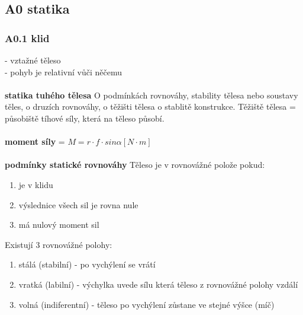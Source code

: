 \documentclass{article}
\begin{document}
\subsection*{A0 statika}
\subsubsection*{A0.1 klid}
- vztažné těleso \\
- pohyb je relativní vůči něčemu \\\\
\textbf{statika tuhého tělesa}
O podmínkách rovnováhy, stability tělesa nebo soustavy těles, o druzích rovnováhy, o těžišti tělesa o stablitě konstrukce. Těžiště tělesa = působiště tíhové síly, která na těleso působí. \\\\
\textbf{moment síly} = $M = r \cdot f \cdot sin \alpha [N \cdot m]$ \\\\
\textbf{podmínky statické rovnováhy}
Těleso je v rovnovážné polože pokud:
\begin{enumerate}
    \item je v klidu
    \item výslednice všech sil je rovna nule
    \item má nulový moment sil
\end{enumerate}
Existují 3 rovnovážné polohy:
\begin{enumerate}
    \item stálá (stabilní) - po vychýlení se vrátí 
    \item vratká (labilní) - výchylka uvede sílu která těleso z rovnovážné polohy vzdálí
    \item volná (indiferentní) - těleso po vychýlení zůstane ve stejné výšce (míč)
\end{enumerate}
\end{document}
